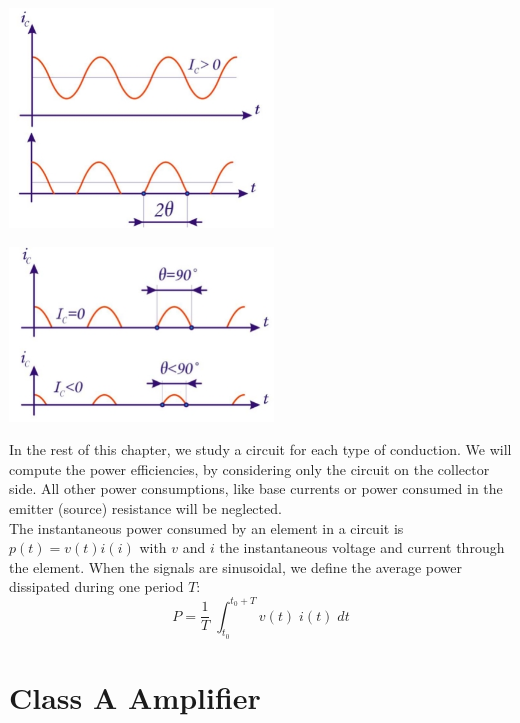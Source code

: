 \begin{minipage}{.5\textwidth}
	\centering
	\includegraphics[width=7cm]{figures/ch09/pa_cycle1.jpg}
	\label{fig:pa_cycle1}
\end{minipage}%
\begin{minipage}{.5\textwidth}
	\centering
	\includegraphics[width=7cm]{figures/ch09/pa_cycle2.jpg}
	\label{fig:pa_cycle2}
\end{minipage}

In the rest of this chapter, we study a circuit for each type of conduction. We will compute the power efficiencies, by considering only the circuit on the collector side. All other power consumptions, like base currents or power consumed in the emitter (source) resistance will be neglected.\\
The instantaneous power consumed by an element in a circuit is $p(t) = v(t) i(i)$ with $v$ and $i$ the instantaneous voltage and current through the element. When the signals are sinusoidal, we define the average power dissipated during one period $T$:
$$
P = \frac{1}{T}\;\int_{t_0}^{t_0 + T} v(t) \; i(t) \; dt
$$

\section{Class A Amplifier}
\label{sec:classA}

